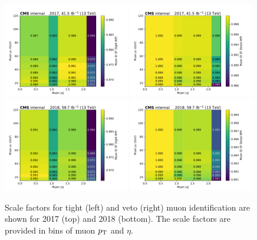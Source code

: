 \begin{figure}[ht!]
  \begin{center}
    \includegraphics[width=0.49\textwidth]{ScaleFactors/Muon/NUM_TightID_DEN_TrackerMuons_abseta_pt_2017.pdf}
    \includegraphics[width=0.49\textwidth]{ScaleFactors/Muon/NUM_LooseID_DEN_TrackerMuons_abseta_pt_2017.pdf} \\
    \includegraphics[width=0.49\textwidth]{ScaleFactors/Muon/NUM_TightID_DEN_TrackerMuons_abseta_pt_2018.pdf}
    \includegraphics[width=0.49\textwidth]{ScaleFactors/Muon/NUM_LooseID_DEN_TrackerMuons_abseta_pt_2018.pdf}
    \caption{
      Scale factors for tight (left) and veto (right) muon identification are shown for 2017 (top) and
      2018 (bottom). The scale factors are provided in bins of muon $p_{\textrm{T}}$ and $\eta$.
    }
    \label{fig:sf_muon_id}
  \end{center}
\end{figure}

